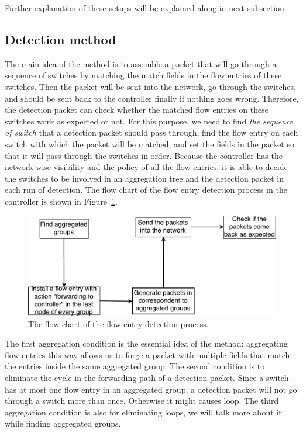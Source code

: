 Further explanation of these setups will be explained along in next subsection.

\subsection{Detection method}
\label{Detection_method}

The main idea of the method is to assemble a packet that will go through a sequence of switches by matching the match fields in the flow entries of these switches. Then the packet will be sent into the network, go through the switches, and should be sent back to the controller finally if nothing goes wrong. Therefore, the detection packet can check whether the matched flow entries on these switches work as expected or not. For this purpose, we need to find \textit{the sequence of switch} that a detection packet should pass through, find the flow entry on each switch with which the packet will be matched, and set the fields in the packet so that it will pass through the switches in order. Because the controller has the network-wise visibility and the policy of all the flow entries, it is able to decide the switches to be involved in an aggregation tree and the detection packet in each run of detection. The flow chart of the flow entry detection process in the controller is shown in Figure~\ref{flow_entry_detection_flowchart}.

\begin{figure}[H]
\begin{center} 
\includegraphics[width=1\textwidth]{figures/flow_entry_detection_flowchart.pdf}
\end{center}
\caption{The flow chart of the flow entry detection process.}
\label{flow_entry_detection_flowchart}
\end{figure}

The first aggregation condition is the essential idea of the method: aggregating flow entries this way allows us to forge a packet with multiple fields that match the entries inside the same aggregated group. The second condition is to eliminate the cycle in the forwarding path of a detection packet. Since a switch has at most one flow entry in an aggregated group, a detection packet will not go through a switch more than once. Otherwise it might causes loop. The third aggregation condition is also for eliminating loops, we will talk more about it while finding aggregated groups. 

